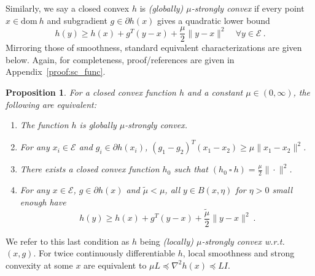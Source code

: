 \documentclass[sn-mathphys,Numbered]{sn-jnl}%
\newtheorem{proposition}[theorem]{Proposition}%
\begin{document}
Similarly, we say a closed convex $h$ is {\it (globally) $\mu$-strongly convex} if every point $x\in\mathrm{dom\ }h$ and subgradient $g\in\partial h(x)$ gives a quadratic lower bound
$$ h(y) \geq h(x) + g^T(y-x) + \frac{\mu}{2}\|y-x\|^2 \quad \forall y\in\mathcal{E} \ . $$
Mirroring those of smoothness, standard equivalent characterizations are given below. Again, for completeness, proof/references are given in Appendix~\ref{proof:sc_func}.
\begin{proposition} \label{prop:sc_func}
    For a closed convex function $h$ and a constant $\mu\in (0,\infty)$, the following are equivalent:
    \begin{enumerate}[label=(\alph*)]
    \item The function $h$ is globally $\mu$-strongly convex.
    \item For any $x_i \in \mathcal{E}$ and $g_i \in \partial h(x_i)$, $(g_1 - g_2)^T(x_1-x_2) \geq \mu\|x_1-x_2\|^2$.
    \item There exists a closed convex function $h_0$ such that $(h_0\  \square\ h) = \frac{\mu}{2}\|\cdot\|^2$.
    \item For any $x\in\mathcal{E}$, $g \in \partial h(x)$ and $\tilde \mu < \mu$, all $y\in B(x,\eta)$ for $\eta>0$ small enough have
    $$ h(y) \geq h(x) + g^T(y-x) + \frac{\tilde \mu}{2}\|y-x\|^2 \ . $$
    \end{enumerate}
\end{proposition}
\noindent We refer to this last condition as $h$ being {\it (locally) $\mu$-strongly convex w.r.t.~$(x,g)$}.
For twice continuously differentiable $h$, local smoothness and strong convexity at some $x$ are equivalent to $ \mu L \preceq \nabla^2h(x) \preceq L I $.
\end{document}
